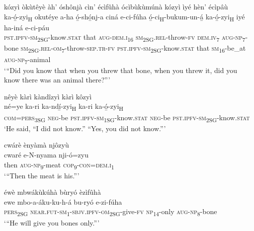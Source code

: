 kózyì òkùtêyè àh’ óshônjà cìn’ écìfûhà ócìbùkùmúnà kózyì ìyé hèn’ écìpâù\\
\gll ka-ó̲-zyi\textsubscript{H}        okutéye  a-ha    ó̲-shó̲nj-a ciná    e-ci-fúha    ó̲-ci\textsubscript{H}{}-bukum-un-á̲ ka-ó̲-zyi\textsubscript{H}        iyé  ha-iná    e-ci-páu \\
\textsc{pst}.\textsc{ipfv}{}-\textsc{sm}\textsubscript{2SG}{}-know.\textsc{stat}  that    \textsc{aug}{}-\textsc{dem}.\textsc{i}\textsubscript{16}  \textsc{sm}\textsubscript{2SG}.\textsc{rel}{}-throw-\textsc{fv}
\textsc{dem}.\textsc{iv}\textsubscript{7}  \textsc{aug}{}-\textsc{np}\textsubscript{7}{}-bone  \textsc{sm}\textsubscript{2SG}.\textsc{rel}{}-\textsc{om}\textsubscript{7}{}-throw-\textsc{sep}.\textsc{tr}{}-\textsc{fv}
\textsc{pst}.\textsc{ipfv}{}-\textsc{sm}\textsubscript{2SG}{}-know.\textsc{stat}  that  \textsc{sm}\textsubscript{16}{}-be\_at  \textsc{aug}{}-\textsc{np}\textsubscript{7}{}-animal\\
\glt ‘“Did you know that when you threw that bone, when you threw it, did you know there was an animal there?”’\bigskip

nêyè kàrì kàndîzyì kàrì kôzyì\\
\gll né=ye    ka-ri    ka-ndí̲-zyi\textsubscript{H} ka-ri    ka-ó̲-zyi\textsubscript{H} \\
\textsc{com}=\textsc{pers}\textsubscript{3SG}  \textsc{neg}{}-be  \textsc{pst}.\textsc{ipfv}{}-\textsc{sm}\textsubscript{1SG}{}-know.\textsc{stat}
\textsc{neg}{}-be   \textsc{pst}.\textsc{ipfv}{}-\textsc{sm}\textsubscript{2SG}{}-know.\textsc{stat}\\
\glt ‘He said, “I did not know.” “Yes, you did not know.”’\bigskip

cwárè ènyàmà njôzyù\\
\gll cwaré  e-N-nyama    nji-ó=zyu\\
then  \textsc{aug}{}-\textsc{np}\textsubscript{9}{}-meat  \textsc{cop}\textsubscript{9}{}-\textsc{con}=\textsc{dem}.\textsc{i}\textsubscript{1}\\
\glt ‘“Then the meat is his.”’\bigskip

éwè mbwákùkúhà bùryó èzìfûhà\\
\gll ewe    mbo-a-áku-ku-h-á        bu-ryó  e-zi-fúha\\
\textsc{pers}\textsubscript{2SG}  \textsc{near}.\textsc{fut}{}-\textsc{sm}\textsubscript{1}{}-\textsc{sbjv}.\textsc{ipfv}{}-\textsc{om}\textsubscript{2SG}{}-give-\textsc{fv}  \textsc{np}\textsubscript{14}{}-only  \textsc{aug}{}-\textsc{np}\textsubscript{8}{}-bone\\
\glt ‘“He will give you bones only.”’\bigskip


